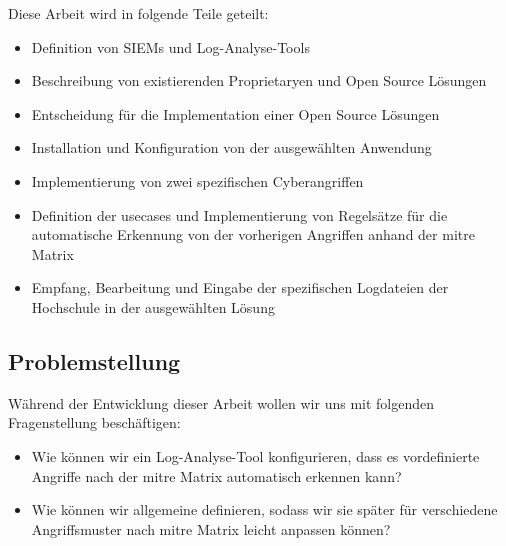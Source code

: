 Diese Arbeit wird in folgende Teile geteilt: 





{
\begin{itemize}[noitemsep]
   \item	Definition von SIEMs und Log-Analyse-Tools 
   \item	Beschreibung von existierenden \gls{Proprietary}en und Open Source Lösungen
   \item	Entscheidung für die Implementation einer Open Source Lösungen 
   \item	Installation und Konfiguration von der ausgewählten Anwendung 
   \item	Implementierung von zwei spezifischen Cyberangriffen 
   \item	Definition der \gls{usecases} und Implementierung von Regelsätze für die automatische Erkennung von der vorherigen Angriffen anhand der \gls{mitre} Matrix 
   \item	Empfang, Bearbeitung und Eingabe der spezifischen Logdateien der Hochschule in der ausgewählten Lösung  
\end{itemize}
}

\subsection{Problemstellung}
Während der Entwicklung dieser Arbeit wollen wir uns mit folgenden Fragenstellung beschäftigen: 

{
\begin{itemize}[noitemsep]
   \item Wie können wir ein Log-Analyse-Tool konfigurieren, dass es vordefinierte Angriffe nach der \gls{mitre} Matrix automatisch erkennen kann? 
   \item Wie können wir allgemeine  definieren, sodass wir sie später für verschiedene Angriffsmuster nach \gls{mitre} Matrix leicht anpassen können?
\end{itemize}
}

